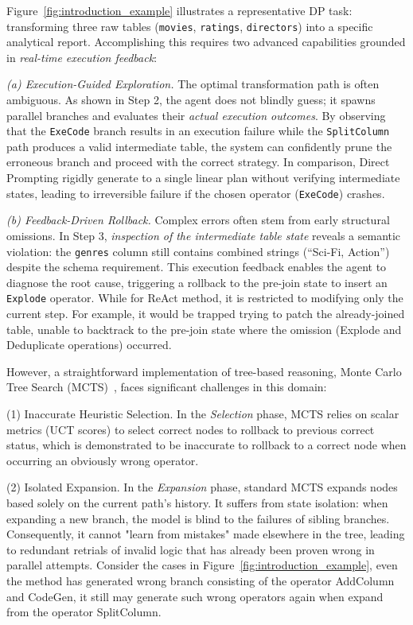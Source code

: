 \begin{example}
Figure~\ref{fig:introduction_example} illustrates a representative DP task: transforming three raw tables (\texttt{movies}, \texttt{ratings}, \texttt{directors}) into a specific analytical report.
Accomplishing this requires two advanced capabilities grounded in \textit{real-time execution feedback}:

{\em (a) {Execution-Guided Exploration.}}
The optimal transformation path is often ambiguous. As shown in Step 2, the agent does not blindly guess; it spawns parallel branches and evaluates their \textit{actual execution outcomes}. By observing that the \texttt{ExeCode} branch results in an execution failure while the \texttt{SplitColumn} path produces a valid intermediate table, the system can confidently prune the erroneous branch and proceed with the correct strategy. 
In comparison, Direct Prompting rigidly generate to a single linear plan without verifying intermediate states, leading to irreversible failure if the chosen operator (\eg \texttt{ExeCode}) crashes.

{\em (b) {Feedback-Driven Rollback.}}
Complex errors often stem from early structural omissions. In Step 3, \textit{inspection of the intermediate table state} reveals a semantic violation: the \texttt{genres} column still contains combined strings (\eg ``Sci-Fi, Action'') despite the schema requirement. This execution feedback enables the agent to diagnose the root cause, triggering a rollback to the pre-join state to insert an \texttt{Explode} operator.
While for ReAct method, it is restricted to modifying only the current step. For example, it would be trapped trying to patch the already-joined table, unable to backtrack to the pre-join state where the omission (Explode and Deduplicate operations) occurred.

\end{example}

However, a straightforward implementation of tree-based reasoning, Monte Carlo Tree Search (MCTS)~\cite{li2025alphasql}, faces significant challenges in this domain:

(1) Inaccurate Heuristic Selection. In the \textit{Selection} phase, MCTS relies on scalar metrics (\eg UCT scores) to select correct nodes to rollback to previous correct status, which is demonstrated to be inaccurate to rollback to a correct node when occurring an obviously wrong operator.

(2) Isolated Expansion. In the \textit{Expansion} phase, standard MCTS expands nodes based solely on the current path's history. It suffers from state isolation: when expanding a new branch, the model is blind to the failures of sibling branches. Consequently, it cannot "learn from mistakes" made elsewhere in the tree, leading to redundant retrials of invalid logic that has already been proven wrong in parallel attempts. Consider the cases in Figure~\ref{fig:introduction_example}, even the method has generated wrong branch consisting of the operator AddColumn and CodeGen, it still may generate such wrong operators again when expand from the operator SplitColumn.

